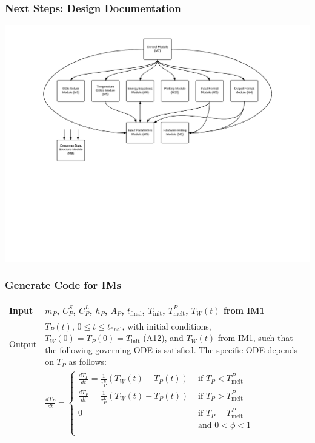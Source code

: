 \documentclass{beamer}
\newcommand{\colAwidth}{0.1\textwidth}
\newcommand{\colBwidth}{0.8\textwidth}
\begin{document}
\begin{frame}

\frametitle{Next Steps: Design Documentation}

\begin{center}
\includegraphics[scale=0.47]{UsesHierarchy.pdf}
\end{center}

\end{frame}


\begin{frame}

\frametitle{Generate Code for IMs}

\noindent
\begin{minipage}{\columnwidth}
\begin{tabular}{@{} p{\colAwidth}  p{\colBwidth}@{}}
\toprule
Input&  $m_P$, $C_P^S$, $C_P^L$, $h_P$, $A_P$, $t_\text{final}$, $T_\text{init}$, $T_\text{melt}^P$,
$T_W(t)$ from IM1\\
\midrule
Output & $T_P(t)$, $0 \leq t \leq t_\text{final}$, with initial 
conditions, $T_W(0) = T_P(0) = T_\text{init}$ (A12), and $T_W(t)$ 
from IM1, such that the following governing ODE is satisfied.  The
specific ODE depends on $T_P$ as follows:\\
&  $
  \frac{dT_P}{dt} = \begin{cases}
  \frac{dT_P}{dt} = \frac{1}{\tau^S_P}(T_W(t) - T_P(t)) & \text { if } T_P<T_\text{melt}^P\\
  \frac{dT_P}{dt} = \frac{1}{\tau^L_P}(T_W(t) - T_P(t)) & \text { if } T_P>T_\text{melt}^P\\
  0 & \text { if }  T_P=T_\text{melt}^P \\
   ~ & \text{ and } 0 < \phi < 1\\
  \end{cases}
  $
\\
\bottomrule
\end{tabular}
\end{minipage}

\end{frame}
\end{document}
